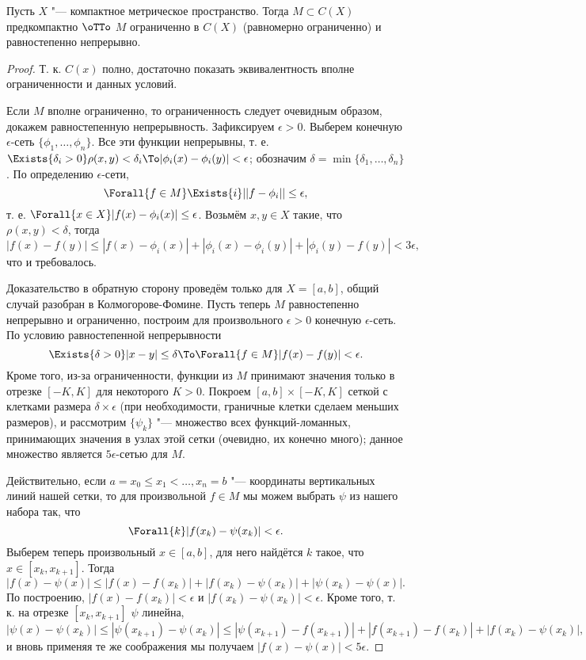 \documentclass[main]{subfiles}
\begin{document}
\begin{theorem}
  Пусть \( X \) "--- компактное метрическое пространство.
  Тогда \( M \subset C(X) \)
  предкомпактно \( \oTTo \)
  \( M \) ограниченно в \( C(X) \) (равномерно ограниченно)
  и равностепенно непрерывно.
\end{theorem}
\begin{proof}
  Т. к. \( C(x) \) полно, достаточно показать эквивалентность
  вполне ограниченности и данных условий.

  Если \( M \) вполне ограниченно, то
  ограниченность следует очевидным образом,
  докажем равностепенную непрерывность.
  Зафиксируем \( \epsilon > 0 \).
  Выберем конечную \( \epsilon \)-сеть
  \( \{ \phi_1, \dots, \phi_n \} \).
  Все эти функции непрерывны, т. е.
  \( \Exists{\delta_i > 0} \rho(x, y) < \delta_i \To
  |\phi_i(x) - \phi_i(y)| < \epsilon \);
  обозначим \( \delta = \min \{ \delta_1, \dots, \delta_n \} \).
  По определению \( \epsilon \)-сети,
  \[ \Forall{f \in M} \Exists{i} ||f - \phi_i|| \le \epsilon, \]
  т. е. \( \Forall{x \in X} |f(x) - \phi_i(x)| \le \epsilon \).
  Возьмём \( x, y \in X \) такие, что \( \rho(x, y) < \delta \),
  тогда
  \[
    |f(x) - f(y)| \le
    |f(x) - \phi_i(x)| + |\phi_i(x) - \phi_i(y)| + |\phi_i(y) - f(y)| <
    3\epsilon, \]
  что и требовалось.

  Доказательство в обратную сторону проведём только для
  \( X = [a, b] \), общий случай разобран в Колмогорове-Фомине.
  Пусть теперь \( M \) равностепенно непрерывно и ограниченно,
  построим для произвольного \( \epsilon > 0 \) конечную \( \epsilon \)-сеть.
  По условию равностепенной непрерывности
  \[ \Exists{\delta > 0} |x - y| \le \delta \To \Forall{f \in M} |f(x) - f(y)| < \epsilon. \]
  Кроме того, из-за ограниченности, функции из \( M \) принимают значения
  только в отрезке \( [-K, K] \) для некоторого \( K > 0 \).
  Покроем \( [a, b] \times [-K, K] \) сеткой с клетками размера
  \( \delta \times \epsilon \)
  (при необходимости, граничные клетки сделаем меньших размеров),
  и рассмотрим \( \{ \psi_k \} \) "---
  множество всех функций-ломанных,
  принимающих значения в узлах этой сетки
  (очевидно, их конечно много);
  данное множество является \( 5\epsilon \)-сетью для \( M \).

  Действительно, если \( a = x_0 \le x_1 < \dots, x_n = b \) "---
  координаты вертикальных линий нашей сетки,
  то для произвольной \( f \in M \)
  мы можем выбрать \( \psi \) из нашего набора
  так, что
  \[ \Forall{k} |f(x_k) - \psi(x_k)| < \epsilon. \]
  Выберем теперь произвольный \( x \in [a, b] \), для него найдётся
  \( k \) такое, что \( x \in [x_k, x_{k+1}] \). Тогда
  \[
    |f(x) - \psi(x)| \le |f(x) - f(x_k)| + |f(x_k) - \psi(x_k)| +
    |\psi(x_k) - \psi(x)|.
  \]
  По построению, \( |f(x) - f(x_k)| < \epsilon \) и
  \( |f(x_k) - \psi(x_k)| < \epsilon \).
  Кроме того,
  т. к. на отрезке \( [x_k, x_{k+1}] \) \( \psi \) линейна,
  \[
    |\psi(x) - \psi(x_k)| \le
    |\psi(x_{k+1}) - \psi(x_k)| \le
    |\psi(x_{k + 1}) - f(x_{k + 1})| +
    |f(x_{k + 1}) - f(x_k)| +
    |f(x_{k}) - \psi(x_k)|,
  \]
  и вновь применяя те же соображения мы получаем
  \( |f(x) - \psi(x)| < 5 \epsilon \).
\end{proof}
\end{document}
